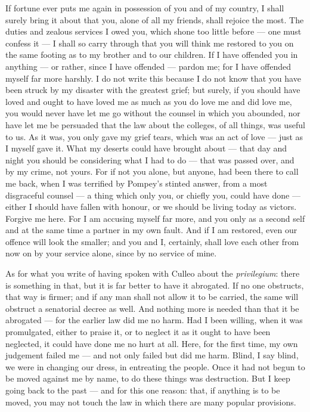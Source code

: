  If fortune ever puts me again in possession of you and of my country, I shall surely bring it about that you, alone of all my friends, shall rejoice the most. The duties and zealous services I owed you, which shone too little before --- one must confess it --- I shall so carry through that you will think me restored to you on the same footing as to my brother and to our children. If I have offended you in anything --- or rather, since I have offended --- pardon me; for I have offended myself far more harshly. I do not write this because I do not know that you have been struck by my disaster with the greatest grief; but surely, if you should have loved and ought to have loved me as much as you do love me and did love me, you would never have let me go without the counsel in which you abounded, nor have let me be persuaded that the law about the colleges, of all things, was useful to us. As it was, you only gave my grief tears, which was an act of love --- just as I myself gave it. What my deserts could have brought about --- that day and night you should be considering what I had to do --- that was passed over, and by my crime, not yours. For if not you alone, but anyone, had been there to call me back, when I was terrified by Pompey's stinted answer, from a most disgraceful counsel --- a thing which only you, or chiefly you, could have done --- either I should have fallen with honour, or we should be living today as victors. Forgive me here. For I am accusing myself far more, and you only as a second self and at the same time a partner in my own fault. And if I am restored, even our offence will look the smaller; and you and I, certainly, shall love each other from now on by your service alone, since by no service of mine.

 As for what you write of having spoken with Culleo about the \textit{privilegium}: there is something in that, but it is far better to have it abrogated. If no one obstructs, that way is firmer; and if any man shall not allow it to be carried, the same will obstruct a senatorial decree as well. And nothing more is needed than that it be abrogated --- for the earlier law did me no harm. Had I been willing, when it was promulgated, either to praise it, or to neglect it as it ought to have been neglected, it could have done me no hurt at all. Here, for the first time, my own judgement failed me --- and not only failed but did me harm. Blind, I say blind, we were in changing our dress, in entreating the people. Once it had not begun to be moved against me by name, to do these things was destruction. But I keep going back to the past --- and for this one reason: that, if anything is to be moved, you may not touch the law in which there are many popular provisions.

